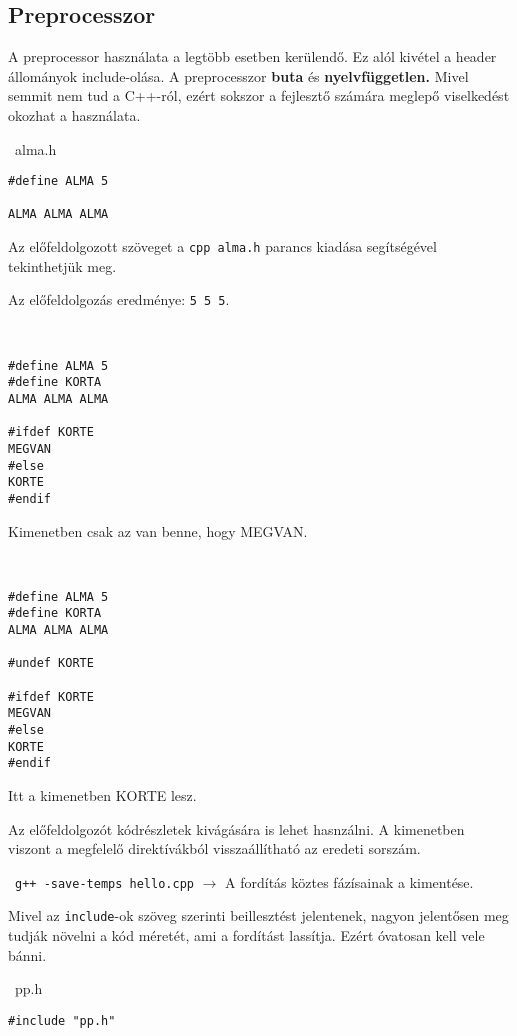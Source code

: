 \documentclass[a4paper,11.5pt]{article}
\begin{document}
	\subsection{Preprocesszor}
	A preprocessor használata a legtöbb esetben kerülendő. Ez alól kivétel a header állományok include-olása. A preprocesszor \textbf{buta} és \textbf{nyelvfüggetlen.} Mivel semmit nem tud a C++-ról, ezért sokszor a fejlesztő számára meglepő viselkedést okozhat a használata.
	\begin{example}\ 
		alma.h
		\begin{lstlisting}
#define ALMA 5

ALMA ALMA ALMA
		\end{lstlisting}
		Az előfeldolgozott szöveget a \texttt{cpp alma.h} parancs kiadása segítségével tekinthetjük meg.
		
		Az előfeldolgozás eredménye: \texttt{5 5 5}.
	\end{example}
	\begin{example}\
		
		\begin{lstlisting}
#define ALMA 5
#define KORTA
ALMA ALMA ALMA

#ifdef KORTE
MEGVAN
#else
KORTE
#endif
		\end{lstlisting}
		Kimenetben csak az van benne, hogy MEGVAN.
	\end{example}
	
	\begin{example}\
		
		\begin{lstlisting}
#define ALMA 5
#define KORTA
ALMA ALMA ALMA

#undef KORTE

#ifdef KORTE
MEGVAN
#else
KORTE
#endif
		\end{lstlisting}
		Itt a kimenetben KORTE lesz.
	\end{example}
	Az előfeldolgozót kódrészletek kivágására is lehet hasnzálni. A kimenetben viszont a megfelelő direktívákból visszaállítható az eredeti sorszám.
	\begin{note}\
		\texttt{g++ -save-temps hello.cpp} $\rightarrow$ A fordítás köztes fázísainak a kimentése.
	\end{note}
	Mivel az \texttt{include}-ok szöveg szerinti beillesztést jelentenek, nagyon jelentősen meg tudják növelni a kód méretét, ami a fordítást lassítja. Ezért óvatosan kell vele bánni.
	\begin{example}\ 
		pp.h
		\begin{lstlisting}
#include "pp.h"
		\end{lstlisting}
	\end{example}
		
\end{document}
